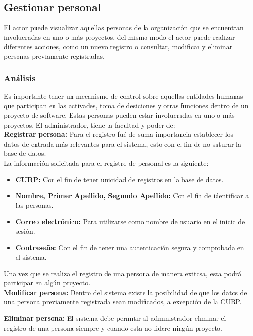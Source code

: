 \subsection{Gestionar personal}
El actor puede visualizar aquellas personas de la organización que se encuentran involucradas en uno o más proyectos, del  mismo modo el actor puede realizar diferentes acciones, como un nuevo registro o consultar, modificar y eliminar personas previamente registradas.

\subsubsection {Análisis}
Es importante tener un mecanismo de control sobre aquellas entidades humanas que participan en las activades, toma de desiciones y otras funciones dentro de un proyecto de software. Estas personas pueden estar involucradas en uno o más proyectos.
\bigskip
El administrador, tiene la facultad y poder de:\\

\textbf {Registrar persona:} Para el registro fué de suma importancia establecer los datos de entrada más relevantes para el sistema, esto con el fin de no saturar la base de datos.\\

La información solicitada para el registro de personal es la siguiente:

\begin{itemize}
	\item \textbf{CURP:} Con el fin de tener unicidad de registros en la base de datos.
	\item \textbf{Nombre, Primer Apellido, Segundo Apellido:} Con el fin de identificar a las personas.
	\item \textbf{Correo electrónico:} Para utilizarse como nombre de usuario en el inicio de sesión.
	\item \textbf{Contraseña:} Con el fin de tener una autenticación segura y comprobada en el sistema.
\end{itemize}

Una vez que se realiza el registro de una persona de manera exitosa, esta podrá participar en algún proyecto.\\

\textbf {Modificar persona:} Dentro del sistema existe la posibilidad de que los datos de una persona previamente registrada sean modificados, a excepción de la CURP.

\textbf {Eliminar persona:} El sistema debe permitir al administrador eliminar el registro de una persona siempre y cuando esta no lidere ningún proyecto.

